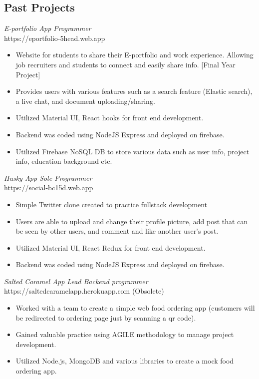 \documentclass[10pt, a4paper]{cv}
\begin{document}
\begin{paracol}{2}
\begin{flushleft}
		\section*{Past Projects}
		 {\sl E-portfolio App \textbar \space Programmer} \\
		https://eportfolio-5head.web.app
		\begin{itemize} \itemsep -2pt
			\item Website for students to share their E-portfolio and work experience. Allowing job recruiters and students to connect and easily share info. [Final Year Project]
			\item Provides users with various features such as a search feature (Elastic search), a live chat, and document uploading/sharing.
			\item Utilized Material UI, React hooks for front end development.
			\item Backend was coded using NodeJS Express and deployed on firebase.
			\item Utilized Firebase NoSQL DB to store various data such as user info, project info, education background etc.
		\end{itemize}
		{\sl Husky App \textbar \space Sole Programmer} \\
		https://social-bc15d.web.app
		\begin{itemize} \itemsep -2pt
			\item Simple Twitter clone created to practice fullstack development
			\item Users are able to upload and change their profile picture, add post that can be seen by other users, and comment and like another user's post.
			\item Utilized Material UI, React Redux for front end development.
			\item Backend was coded using NodeJS Express and deployed on firebase.
		\end{itemize}
		{\sl Salted Caramel App \textbar \space Lead Backend programmer } \\
		https://saltedcaramelapp.herokuapp.com (Obsolete)
		\begin{itemize} \itemsep -2pt
			\item Worked with a team to create a simple web food ordering app (customers will be redirected to ordering page just by scanning a qr code).
			\item Gained valuable practice using AGILE methodology to manage project development.
			\item Utilized Node.js, MongoDB and various libraries to create a mock food ordering app.
		\end{itemize}


\end{flushleft}
\end{paracol}
\end{document}
